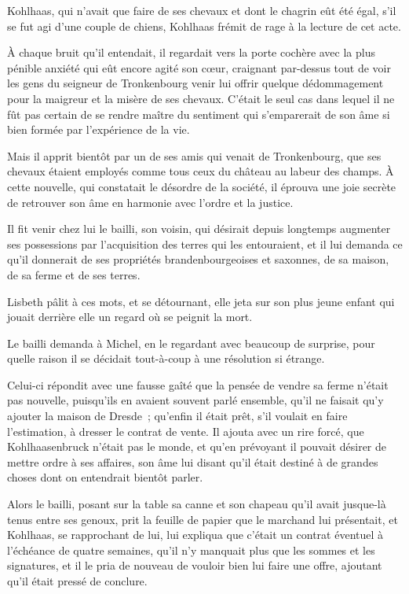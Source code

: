 \documentclass[french,twoside]{book} %
\begin{document}
Kohlhaas, qui n’avait que faire de ses chevaux et dont le chagrin eût été égal, s’il se fut agi d’une couple de chiens, Kohlhaas frémit de rage à la lecture de cet acte.\par
À chaque bruit qu’il entendait, il regardait vers la porte cochère avec la plus pénible anxiété qui eût encore agité son cœur, craignant par-dessus tout de voir les gens du seigneur de Tronkenbourg venir lui offrir quelque dédommagement pour la maigreur et la misère de ses chevaux. C’était le seul cas dans lequel il ne fût pas certain de se rendre maître du sentiment qui s’emparerait de son âme si bien formée par l’expérience de la vie.\par
Mais il apprit bientôt par un de ses amis qui venait de Tronkenbourg, que ses chevaux étaient employés comme tous ceux du château au labeur des champs. À cette nouvelle, qui constatait le désordre de la société, il éprouva une joie secrète de retrouver son âme en harmonie avec l’ordre et la justice.\par
Il fit venir chez lui le bailli, son voisin, qui désirait depuis longtemps augmenter ses possessions par l’acquisition des terres qui les entouraient, et il lui demanda ce qu’il donnerait de ses propriétés brandenbourgeoises et saxonnes, de sa maison, de sa ferme et de ses terres.\par
Lisbeth pâlit à ces mots, et se détournant, elle jeta sur son plus jeune enfant qui jouait derrière elle un regard où se peignit la mort.\par
Le bailli demanda à Michel, en le regardant avec beaucoup de surprise, pour quelle raison il se décidait tout-à-coup à une résolution si étrange.\par
Celui-ci répondit avec une fausse gaîté que la pensée de vendre sa ferme n’était pas nouvelle, puisqu’ils en avaient souvent parlé ensemble, qu’il ne faisait qu’y ajouter la maison de Dresde ; qu’enfin il était prêt, s’il voulait en faire l’estimation, à dresser le contrat de vente. Il ajouta avec un rire forcé, que Kohlhaasenbruck n’était pas le monde, et qu’en prévoyant il pouvait désirer de mettre ordre à ses affaires, son âme lui disant qu’il était destiné à de grandes choses dont on entendrait bientôt parler.\par
Alors le bailli, posant sur la table sa canne et son chapeau qu’il avait jusque-là tenus entre ses genoux, prit la feuille de papier que le marchand lui présentait, et Kohlhaas, se rapprochant de lui, lui expliqua que c’était un contrat éventuel à l’échéance de quatre semaines, qu’il n’y manquait plus que les sommes et les signatures, et il le pria de nouveau de vouloir bien lui faire une offre, ajoutant qu’il était pressé de conclure.\par
\end{document}
